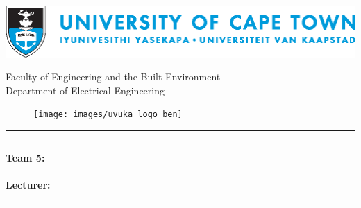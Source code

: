 \begin{center}
\begin{minipage}{1\textwidth}
\begin{center}
	
\begin{center}
\includegraphics[width=1\linewidth]{"UCThoriz"}
\end{center}
\vskip20pt
\LARGE{Faculty of Engineering and the Built Environment}\\
Department of Electrical Engineering\\
\coursecode
\vskip10pt
\begin{figure}[H]
\centering
\hspace{-3em}
\texttt{[image: images/uvuka\_logo\_ben]}
\vskip20pt
\end{figure}
\hrule
\vskip20pt
\Huge\thetitle
\vskip20pt
\hrule
\vskip20pt
\Large\textbf{Team 5:}\\
\theauthor\\
\vskip10pt
\textbf{Lecturer:} \staffmember
\vskip20pt
\hrule
\vskip20pt
\thedate\\
\end{center}
\end{minipage}
\end{center}

\newpage 